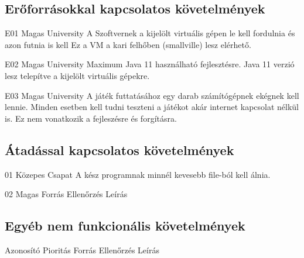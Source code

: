 \documentclass[../../projlab]{subfiles}
\begin{document}
\subsection{Erőforrásokkal kapcsolatos követelmények}

\begin{kovetelmeny}
	{E01} %
	{Magas} %
	{University} %
	{} %
	{A Szoftvernek a kijelölt virtuális gépen le kell fordulnia és azon futnia is kell} %
    Ez a VM a kari felhőben (smallville) lesz elérhető.
\end{kovetelmeny}

\begin{kovetelmeny}
	{E02} %
	{Magas} %
	{University} %
	{} %
	{Maximum Java 11 használható fejlesztésre.} %
    Java 11 verzió lesz telepítve a kijelölt virtuális gépekre.
\end{kovetelmeny}

\begin{kovetelmeny}
	{E03} %
	{Magas} %
	{University} %
	{} %
	{A játék futtatásához egy darab számítógépnek ekégnek kell lennie.} %
    Minden esetben kell tudni teszteni a játékot akár internet kapcsolat nélkül is. Ez nem vonatkozik a fejleszésre és forgításra.
\end{kovetelmeny}

\subsection{Átadással kapcsolatos követelmények}
\begin{kovetelmeny}
    {01} %
    {Közepes} %
    {Csapat} %
    {} %
    {A kész programnak minnél kevesebb file-ból kell álnia.} %

\end{kovetelmeny}

\begin{kovetelmeny}
    {02} %
    {Magas} %
    {Forrás} %
    {Ellenőrzés} %
    {Leírás} %

\end{kovetelmeny}

\subsection{Egyéb nem funkcionális követelmények}
\begin{kovetelmeny}
    {Azonosító} %
    {Pioritás} %
    {Forrás} %
    {Ellenőrzés} %
    {Leírás} %

\end{kovetelmeny}
\end{document}
